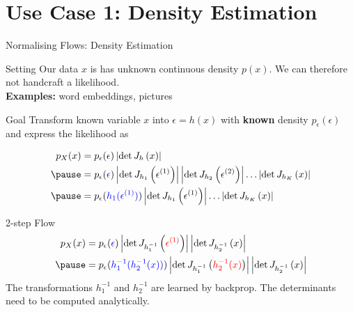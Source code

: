 \documentclass[14pt]{beamer}
\begin{document}
\section{Use Case 1: Density Estimation}
\begin{frame}
\tableofcontents[current]
\end{frame}

\begin{frame}{Normalising Flows: Density Estimation}
\begin{block}{Setting}
Our data $ x $ is has unknown continuous density $ p(x) $.
We can therefore not handcraft a likelihood.
\\ \pause
\textbf{Examples:} word embeddings, pictures
\end{block}
\pause
\begin{block}{Goal}
Transform known variable $ x $ into $ \epsilon = h(x) $ with \textbf{known} density $ p_{\epsilon}(\epsilon) $ and express the likelihood as
\begin{small}
\pause
\begin{equation*}
\begin{aligned}
p_{X}(x) &= p_{\epsilon}(\epsilon)\djac{h}{x} \\ \pause
&= p_{\epsilon}(\textcolor{blue}{\epsilon})\djac{h_{1}}{\epsilon^{(1)}}\djac{h_{2}}{\epsilon^{(2)}}\ldots \djac{h_{K}}{x} \\ \pause
&= p_{\epsilon}(\textcolor{blue}{h_{1}(\epsilon^{(1)})})\djac{h_{1}}{\epsilon^{(1)}}\ldots \djac{h_{K}}{x}
\end{aligned}
\end{equation*}
\end{small}
\end{block}
\end{frame}

\begin{frame}{2-step Flow}
\begin{equation*}
\begin{aligned}
p_{X}(x) &= p_{\epsilon}(\textcolor{blue}{\epsilon})\djac{h_{1}^{-1}}{\textcolor{red}{\epsilon^{(1)}}}\djac{h_{2}^{-1}}{x} \\ \pause
&= p_{\epsilon}(\textcolor{blue}{h_{1}^{-1}(h_{2}^{-1}(x))})\djac{h_{1}^{-1}}{\textcolor{red}{h_{2}^{-1}(x)}}\djac{h_{2}^{-1}}{x}
\end{aligned}
\end{equation*}
\pause
The transformations $ h^{-1}_{1} $ and $ h^{-1}_{2} $ are learned by backprop. The determinants need to be computed analytically.
\end{frame}
\end{document}
